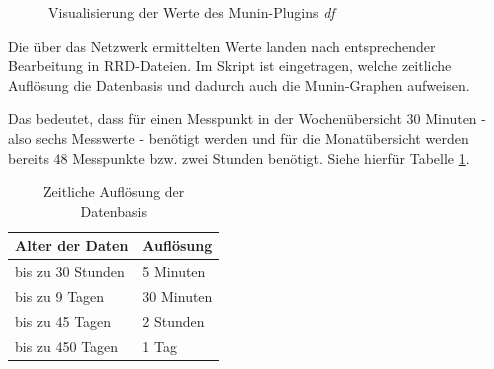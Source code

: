 \begin{figure}[ht]
	\centering
		\caption{Visualisierung der Werte des Munin-Plugins \textit{df}}
		\label{df-graph}
\end{figure}

Die über das Netzwerk ermittelten Werte landen nach entsprechender Bearbeitung in RRD-Dateien. 
Im Skript  ist eingetragen, welche zeitliche Auflösung die Datenbasis und dadurch auch die Munin-Graphen aufweisen.

Das bedeutet, dass für einen Messpunkt in der Wochenübersicht 30 Minuten - also sechs Messwerte - benötigt werden und für die Monatübersicht werden bereits 48 Messpunkte bzw. zwei Stunden benötigt. Siehe hierfür Tabelle \ref{timeres-tab}.

\begin{table}[!htbp]
\centering
\begin{tabular}{l l}
\textbf{Alter der Daten } \hspace{10 mm} & \textbf{Auflösung} \hspace{10 mm} \\
\hline
bis zu 30 Stunden & 5 Minuten  \\
\hline
bis zu 9 Tagen & 30 Minuten \\
\hline
bis zu 45 Tagen & 2 Stunden \\
\hline
bis zu 450 Tagen & 1 Tag \\
\bottomrule
\end{tabular}
\caption[Zeitliche Auflösung der Datenbasis]{Zeitliche Auflösung der Datenbasis\protect\footnotemark}
\label{timeres-tab}
\end{table}


